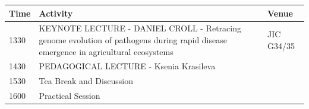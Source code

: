 \documentclass[12pt,]{book}
\theoremstyle{definition}
\theoremstyle{definition}
\theoremstyle{remark}
\begin{document}
\begin{longtable}[]{@{}lll@{}}
\toprule
\begin{minipage}[b]{0.09\columnwidth}\raggedright\strut
Time\strut
\end{minipage} & \begin{minipage}[b]{0.39\columnwidth}\raggedright\strut
Activity\strut
\end{minipage} & \begin{minipage}[b]{0.13\columnwidth}\raggedright\strut
Venue\strut
\end{minipage}\tabularnewline
\midrule
\endhead
\begin{minipage}[t]{0.09\columnwidth}\raggedright\strut
1330\strut
\end{minipage} & \begin{minipage}[t]{0.39\columnwidth}\raggedright\strut
KEYNOTE LECTURE - DANIEL CROLL - Retracing genome evolution of pathogens
during rapid disease emergence in agricultural ecosystems\strut
\end{minipage} & \begin{minipage}[t]{0.13\columnwidth}\raggedright\strut
JIC G34/35\strut
\end{minipage}\tabularnewline
\begin{minipage}[t]{0.09\columnwidth}\raggedright\strut
1430\strut
\end{minipage} & \begin{minipage}[t]{0.39\columnwidth}\raggedright\strut
PEDAGOGICAL LECTURE - Ksenia Krasileva\strut
\end{minipage} & \begin{minipage}[t]{0.13\columnwidth}\raggedright\strut
\strut
\end{minipage}\tabularnewline
\begin{minipage}[t]{0.09\columnwidth}\raggedright\strut
1530\strut
\end{minipage} & \begin{minipage}[t]{0.39\columnwidth}\raggedright\strut
Tea Break and Discussion\strut
\end{minipage} & \begin{minipage}[t]{0.13\columnwidth}\raggedright\strut
\strut
\end{minipage}\tabularnewline
\begin{minipage}[t]{0.09\columnwidth}\raggedright\strut
1600\strut
\end{minipage} & \begin{minipage}[t]{0.39\columnwidth}\raggedright\strut
Practical Session\strut
\end{minipage} & \begin{minipage}[t]{0.13\columnwidth}\raggedright\strut
\strut
\end{minipage}\tabularnewline
\bottomrule
\end{longtable}
\end{document}
